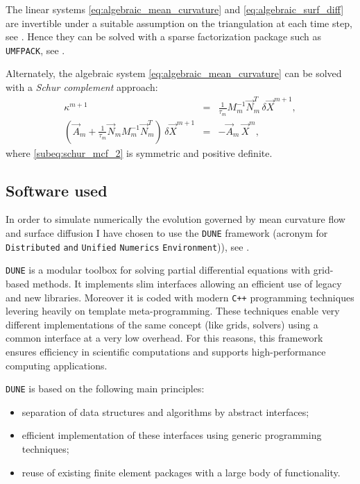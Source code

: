 \documentclass[a4paper,11pt, onecolumn]{article}
\newcommand{\cor}[1]{\textit{#1}} %
\begin{document}
The linear systems \eqref{eq:algebraic_mean_curvature} and
\eqref{eq:algebraic_surf_diff} are invertible under a suitable assumption on the
triangulation at each time step, see \cite{gflows3d}. Hence they can be solved
with a sparse factorization package such as \verb|UMFPACK|, see \cite{Davis04}.
\newline

Alternately, the algebraic system \eqref{eq:algebraic_mean_curvature} can be
solved with a \cor{Schur complement} approach:
\begin{subequations}
 \begin{eqnarray}
  \kappa^{m + 1} & = & \frac{1}{\tau_m} M_m^{-1} \vec{N}^{T}_m \, \delta
  \vec{X}^{m + 1} \label{subeq:schur_mcf_1} , \\
  (\vec{A}_m + \frac{1}{\tau_m} \vec{N}_m M_m^{-1} \vec{N}^{T}_m) \, \delta
  \vec{X}^{m + 1} & = & - \vec{A}_m \, \vec{X}^{m} , \label{subeq:schur_mcf_2}
 \end{eqnarray}
\end{subequations}
where \eqref{subeq:schur_mcf_2} is symmetric and positive definite.

\subsection{Software used}

In order to simulate numerically the evolution governed by mean curvature flow
and surface diffusion I have chosen to use the \verb|DUNE| framework (acronym
for \verb|Distributed| \verb|and| \verb|Unified| \verb|Numerics|
\verb|Environment|)), see
\cite{dunegridpaperI08,dunegridpaperII08,ISTL,ISTLParallel}.

\verb|DUNE| is a modular toolbox for solving partial differential equations
with grid-based methods. It implements slim interfaces allowing an efficient use
of legacy and new libraries. Moreover it is coded with modern \verb|C++|
programming techniques levering heavily on template meta-programming. These
techniques enable very different implementations of the same concept (like
grids, solvers) using a common interface at a very low overhead. For this
reasons, this framework ensures efficiency in scientific computations and
supports high-performance computing applications.

\verb|DUNE| is based on the following main principles:
\begin{itemize}
 \item separation of data structures and algorithms by abstract interfaces;
 \item efficient implementation of these interfaces using generic programming
 techniques;
 \item reuse of existing finite element packages with a large body of
 functionality.
\end{itemize}
\end{document}
